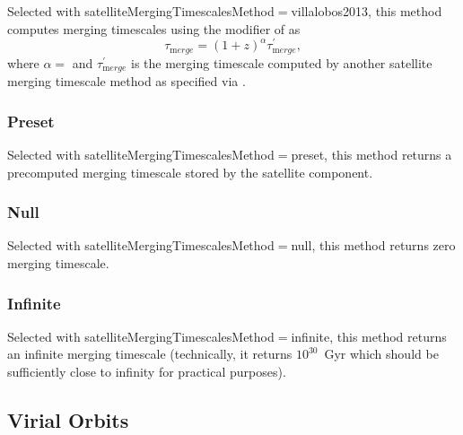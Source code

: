 Selected with {\normalfont \ttfamily satelliteMergingTimescalesMethod}$=${\normalfont \ttfamily villalobos2013}, this method computes merging timescales using the modifier of \cite{villalobos_improved_2013} as
\begin{equation}
\tau_{\mathrm merge} = (1+z)^\alpha \tau^\prime_{\mathrm merge},
\end{equation}
where $\alpha=${\normalfont {}} and $\tau^\prime_{\mathrm merge}$ is the merging timescale computed by another satellite merging timescale method as specified via {\normalfont {}}.

\subsubsection{Preset}\label{phys:satelliteMergingTimescales:satelliteMergingTimescalesPreset}

Selected with {\normalfont \ttfamily satelliteMergingTimescalesMethod}$=${\normalfont \ttfamily preset}, this method returns a precomputed merging timescale stored by the satellite component.

\subsubsection{Null}\label{phys:satelliteMergingTimescales:satelliteMergingTimescalesNull}

Selected with {\normalfont \ttfamily satelliteMergingTimescalesMethod}$=${\normalfont \ttfamily null}, this method returns zero merging timescale.

\subsubsection{Infinite}\label{phys:satelliteMergingTimescales:satelliteMergingTimescalesInfinite}

Selected with {\normalfont \ttfamily satelliteMergingTimescalesMethod}$=${\normalfont \ttfamily infinite}, this method returns an infinite merging timescale (technically, it returns $10^{30}$~Gyr which should be sufficiently close to infinity for practical purposes).

\subsection{Virial Orbits}\label{sec:SatelliteVirialOrbits}

